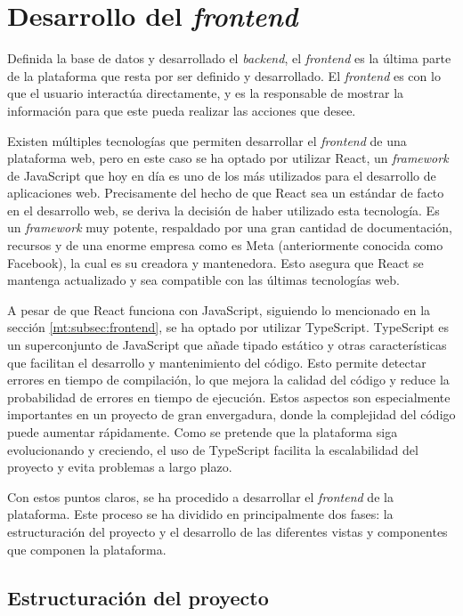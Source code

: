 \section{Desarrollo del \textit{frontend}}
\label{dev:sec:desarrollo_frontend}

Definida la base de datos y desarrollado el \textit{backend}, el \textit{frontend} es la última parte de la plataforma que resta por ser definido y desarrollado. El \textit{frontend} es con lo que el usuario interactúa directamente, y es la responsable de mostrar la información para que este pueda realizar las acciones que desee.

Existen múltiples tecnologías que permiten desarrollar el \textit{frontend} de una plataforma web, pero en este caso se ha optado por utilizar React, un \textit{framework} de JavaScript que hoy en día es uno de los más utilizados para el desarrollo de aplicaciones web. Precisamente del hecho de que React sea un estándar de facto en el desarrollo web, se deriva la decisión de haber utilizado esta tecnología. Es un \textit{framework} muy potente, respaldado por una gran cantidad de documentación, recursos y de una enorme empresa como es Meta (anteriormente conocida como Facebook), la cual es su creadora y mantenedora. Esto asegura que React se mantenga actualizado y sea compatible con las últimas tecnologías web.

A pesar de que React funciona con JavaScript, siguiendo lo mencionado en la sección \ref{mt:subsec:frontend}, se ha optado por utilizar TypeScript. TypeScript es un superconjunto de JavaScript que añade tipado estático y otras características que facilitan el desarrollo y mantenimiento del código. Esto permite detectar errores en tiempo de compilación, lo que mejora la calidad del código y reduce la probabilidad de errores en tiempo de ejecución. Estos aspectos son especialmente importantes en un proyecto de gran envergadura, donde la complejidad del código puede aumentar rápidamente. Como se pretende que la plataforma siga evolucionando y creciendo, el uso de TypeScript facilita la escalabilidad del proyecto y evita problemas a largo plazo.

Con estos puntos claros, se ha procedido a desarrollar el \textit{frontend} de la plataforma. Este proceso se ha dividido en principalmente dos fases: la estructuración del proyecto y el desarrollo de las diferentes vistas y componentes que componen la plataforma.

\subsection{Estructuración del proyecto}
\label{dev:subsec:estructuracion_proyecto}

